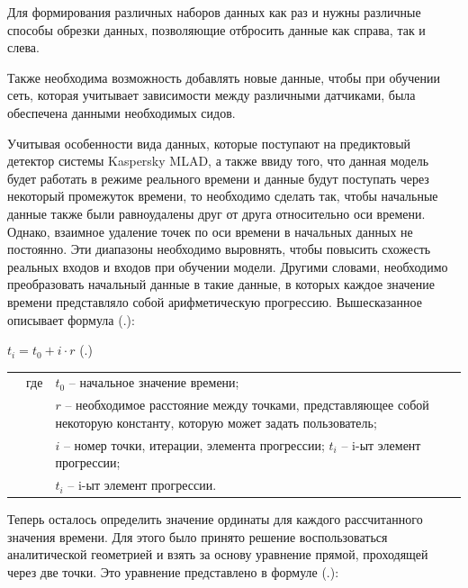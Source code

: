 {  \par \redline Для формирования различных наборов данных как раз и нужны различные способы обрезки данных, позволяющие отбросить данные как справа, так и слева. 

  \par \redline Также необходима возможность добавлять новые данные, чтобы при обучении сеть, которая учитывает зависимости между различными датчиками, была обеспечена данными необходимых сидов.  

  \par \redline Учитывая особенности вида данных, которые поступают на предиктовый детектор системы Kaspersky MLAD, а также ввиду того, что данная модель будет работать в режиме реального времени и данные будут поступать через некоторый промежуток времени, то необходимо сделать так, чтобы начальные данные также были равноудалены друг от друга относительно оси времени. Однако, взаимное удаление точек по оси времени в начальных данных не постоянно. Эти диапазоны необходимо выровнять, чтобы повысить схожесть реальных входов и входов при обучении модели. Другими словами, необходимо преобразовать начальный данные в такие данные, в которых каждое значение времени представляло собой арифметическую прогрессию. Вышесказанное описывает формула (\thechaptercntr .\theformulacntr):

	\formulaspace \par \redline 
    $t_i = t_0 + i \cdot r$
	  \hfill (\thechaptercntr .\theformulacntr) \redline
	\formulaspace \addtocounter{formulacntr}{1}

  \begin{tabular}{p{}p{}p{}}
		& где  & $t_0$ {--} начальное значение времени; \\
		& 	   & $r$ {--} необходимое расстояние между точками, представляющее собой некоторую константу, которую может задать пользователь; \\
    & 	   & $i$ {--} номер точки, итерации, элемента прогрессии; $t_i$ {--} i-ыт элемент прогрессии;  \\
    & 	   & $t_i$ {--} i-ыт элемент прогрессии. \\
  \end{tabular}

  \par \redline Теперь осталось определить значение ординаты для каждого рассчитанного значения времени. Для этого было принято решение воспользоваться аналитической геометрией и взять за основу уравнение прямой, проходящей через две точки. Это уравнение представлено в формуле (\thechaptercntr .\theformulacntr):  

}
